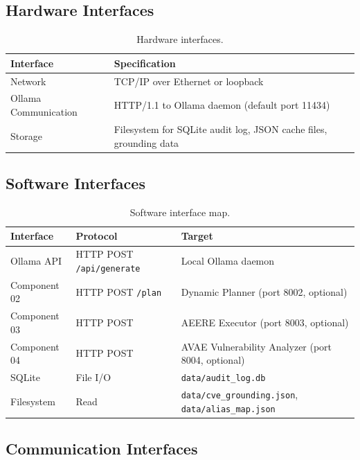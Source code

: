 \documentclass[10pt,journal,onecolumn]{IEEEtran}
\begin{document}
\subsection{Hardware Interfaces}
\begin{table}[h]
\caption{Hardware interfaces.}
\label{tab:hwinterface}
\begin{tabularx}{\columnwidth}{l X}
\toprule
\textbf{Interface} & \textbf{Specification}\\
\midrule
Network & TCP/IP over Ethernet or loopback\\
Ollama Communication & HTTP/1.1 to Ollama daemon (default port 11434)\\
Storage & Filesystem for SQLite audit log, JSON cache files, grounding data\\
\bottomrule
\end{tabularx}
\end{table}

\subsection{Software Interfaces}
\begin{table}[t]
\caption{Software interface map.}
\label{tab:swinterfaces}
\begin{tabularx}{\textwidth}{l l X}
\toprule
\textbf{Interface} & \textbf{Protocol} & \textbf{Target}\\
\midrule
Ollama API & HTTP POST \texttt{/api/generate} & Local Ollama daemon\\
Component 02 & HTTP POST \texttt{/plan} & Dynamic Planner (port 8002, optional)\\
Component 03 & HTTP POST & AEERE Executor (port 8003, optional)\\
Component 04 & HTTP POST & AVAE Vulnerability Analyzer (port 8004, optional)\\
SQLite & File I/O & \texttt{data/audit\_log.db}\\
Filesystem & Read & \texttt{data/cve\_grounding.json}, \texttt{data/alias\_map.json}\\
\bottomrule
\end{tabularx}
\end{table}

\subsection{Communication Interfaces}
\end{document}
